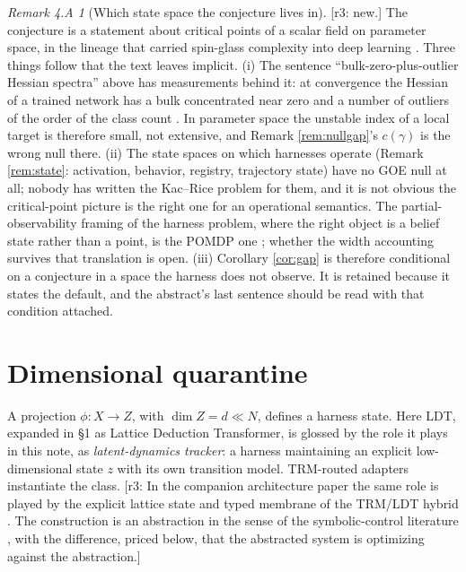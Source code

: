 \documentclass[11pt]{article}
\theoremstyle{definition}
\theoremstyle{remark}
\newtheorem*{remfourA}{Remark 4.A}
\newcommand{\revnote}[1]{\textcolor{red!60!black}{[r3: #1]}}
\begin{document}
\begin{remfourA}[Which state space the conjecture lives in]
\revnote{new.} The conjecture is a statement about critical points of a scalar field on parameter space, in the lineage that carried spin-glass complexity into deep learning \cite{dauphin2014,choromanska2015}. Three things follow that the text leaves implicit. (i) The sentence ``bulk-zero-plus-outlier Hessian spectra'' above has measurements behind it: at convergence the Hessian of a trained network has a bulk concentrated near zero and a number of outliers of the order of the class count \cite{sagun2018,ghorbani2019,papyan2020}. In parameter space the unstable index of a local target is therefore small, not extensive, and Remark \ref{rem:nullgap}'s $c(\gamma)$ is the wrong null there. (ii) The state spaces on which harnesses operate (Remark \ref{rem:state}: activation, behavior, registry, trajectory state) have no GOE null at all; nobody has written the Kac--Rice problem for them, and it is not obvious the critical-point picture is the right one for an operational semantics. The partial-observability framing of the harness problem, where the right object is a belief state rather than a point, is the POMDP one \cite{kaelbling1998}; whether the width accounting survives that translation is open. (iii) Corollary \ref{cor:gap} is therefore conditional on a conjecture in a space the harness does not observe. It is retained because it states the default, and the abstract's last sentence should be read with that condition attached.
\end{remfourA}

\section{Dimensional quarantine}\label{sec:quarantine}

A projection $\phi:X\to Z$, with $\dim Z=d\ll N$, defines a harness state. Here LDT, expanded in \S1 as Lattice Deduction Transformer, is glossed by the role it plays in this note, as \emph{latent-dynamics tracker}: a harness maintaining an explicit low-dimensional state $z$ with its own transition model. TRM-routed adapters instantiate the class. \revnote{In the companion architecture paper the same role is played by the explicit lattice state and typed membrane of the TRM/LDT hybrid \cite{dugan2026trmldt,davis2026ldt}. The construction is an abstraction in the sense of the symbolic-control literature \cite{tabuada2009,girard2007}, with the difference, priced below, that the abstracted system is optimizing against the abstraction.}
\end{document}
